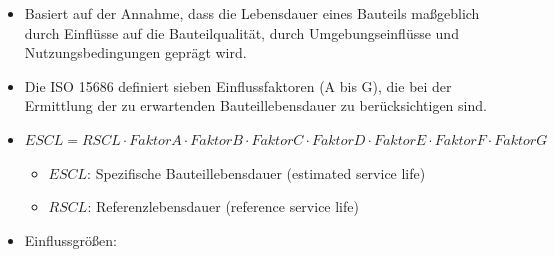 \documentclass[fleqn,twoside,dvipsnames]{article}
\begin{document}
\begin{itemize}
                \begin{itemize}
                    \item Basiert auf der Annahme, dass die Lebensdauer eines Bauteils maßgeblich durch Einflüsse auf die Bauteilqualität, durch Umgebungseinflüsse und Nutzungsbedingungen geprägt wird.
                    \item Die ISO 15686 definiert sieben Einflussfaktoren (A bis G), die bei der Ermittlung der zu erwartenden Bauteillebensdauer zu berücksichtigen sind.
                    \item $ESCL= RSCL\cdot Faktor A \cdot FaktorB \cdot FaktorC \cdot FaktorD \cdot FaktorE \cdot FaktorF \cdot FaktorG$
                        \begin{itemize}
                            \item $ESCL$: Spezifische Bauteillebensdauer (estimated service life)
                            \item $RSCL$: Referenzlebensdauer (reference service life)
                        \end{itemize}
                    \item Einflussgrößen:\\
\end{itemize}
\end{itemize}
\end{document}
